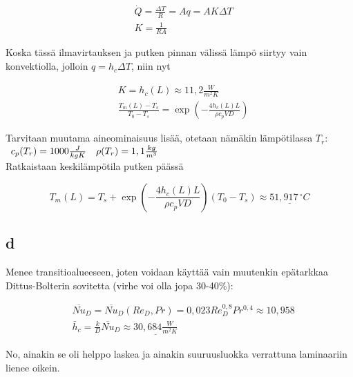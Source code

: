 \documentclass[12pt,a4paper,finnish]{article}
\begin{document}
\begin{align}
 &\dot{Q} = \frac{\Delta T}{R} = Aq = AK\Delta T\\
 &K = \frac{1}{RA}
\end{align}

Koska tässä ilmavirtauksen ja putken pinnan välissä lämpö siirtyy vain konvektiolla, jolloin 
$q = h_c\Delta T$, niin nyt

\begin{align}
 &K = h_c(L) \approx 11,2\frac{W}{m^2K}\\
 &\frac{T_m(L) - T_s}{T_0 - T_s} = \exp\left(-\frac{4h_c(L)L}{\rho c_pVD}\right)
\end{align}

Tarvitaan muutama aineominaisuus lisää, otetaan nämäkin lämpötilassa $T_r$:\\

\begin{math}
  \begin{array}{l l}
  c_p(T_r) = 1000 \frac{J}{kgK} & \rho(T_r) = 1,1 \frac{kg}{m^3}
  \end{array}
\end{math}\\

Ratkaistaan keskilämpötila putken päässä

\begin{equation}
 T_m(L) = T_s + \exp\left(-\frac{4h_c(L)L}{\rho c_pVD}\right)(T_0 - T_s) \approx \underline{51,917\,^{\circ}C}
\end{equation}

\subsection{d}

Menee transitioalueeseen, joten voidaan käyttää vain muutenkin epätarkkaa Dittus-Bolterin sovitetta 
(virhe voi olla jopa 30-40\%):

\begin{align}
 &\overline{Nu}_D = \overline{Nu}_D(Re_D, Pr) = 0,023Re_D^{0,8}Pr^{0,4} \approx 10,958\\
 &\bar{h}_c = \frac{k}{D}\overline{Nu}_D \approx \underline{30,684 \frac{W}{m^2K}}
\end{align}

No, ainakin se oli helppo laskea ja ainakin suuruusluokka verrattuna laminaariin lienee oikein.
\end{document}
